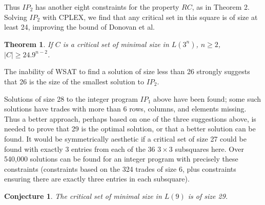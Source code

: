 \documentclass{article}
\newtheorem{theorem}{Theorem}
\newtheorem{conjecture}{Conjecture}
\begin{document}
Thus $IP_2$ has another eight constraints for the property $RC$,
as in Theorem 2. Solving $IP_2$ with CPLEX, we find that any
critical set in this square is of size at least 24, improving the
bound of Donovan et al.

\begin{theorem}
If $C$ is a critical set of minimal size in $L(3^n)$, $n \geq 2$,
$|C| \geq 24.9^{n-2}$.
\end{theorem}

The inability of WSAT to find a solution of size less than 26
strongly suggests that 26 is the size of the smallest solution to
$IP_2$.

Solutions of size 28 to the integer program $IP_1$ above have been
found; some such solutions have trades with more than 6 rows,
columns, and elements missing. Thus a better approach, perhaps
based on one of the three suggestions above, is needed to prove
that 29 is the optimal solution, or that a better solution can be
found.  It would be symmetrically aesthetic if a critical set of
size 27 could be found with exactly 3 entries from each of the 36
$3 \times 3$ subsquares here. Over 540,000 solutions can be found
for an integer program with precisely these constraints
(constraints based on the 324 trades of size 6, plus constraints
ensuring there are exactly three entries in each subsquare).

\begin{conjecture}
The critical set of minimal size in $L(9)$ is of size 29.
\end{conjecture}
\end{document}
